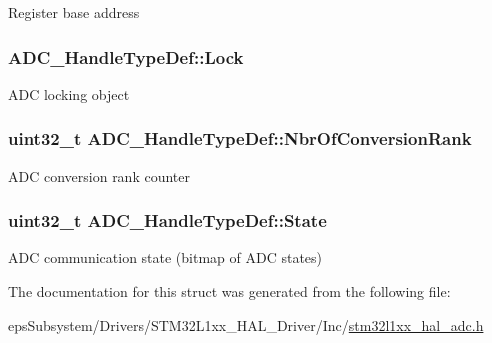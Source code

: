Register base address \hypertarget{struct_a_d_c___handle_type_def_a7ef248e63b28b67cd985bafaeffd68ba}{
\subsubsection[{Lock}]{ A\-D\-C\-\_\-\-Handle\-Type\-Def\-::\-Lock}}\label{struct_a_d_c___handle_type_def_a7ef248e63b28b67cd985bafaeffd68ba}
A\-D\-C locking object \hypertarget{struct_a_d_c___handle_type_def_a2abb5b84e713270bafebe5752bcb91c9}{
\subsubsection[{Nbr\-Of\-Conversion\-Rank}]{ uint32\-\_\-t A\-D\-C\-\_\-\-Handle\-Type\-Def\-::\-Nbr\-Of\-Conversion\-Rank}}\label{struct_a_d_c___handle_type_def_a2abb5b84e713270bafebe5752bcb91c9}
A\-D\-C conversion rank counter \hypertarget{struct_a_d_c___handle_type_def_abd63d2ae2064ef230986a43ae48f3df8}{
\subsubsection[{State}]{ uint32\-\_\-t A\-D\-C\-\_\-\-Handle\-Type\-Def\-::\-State}}\label{struct_a_d_c___handle_type_def_abd63d2ae2064ef230986a43ae48f3df8}
A\-D\-C communication state (bitmap of A\-D\-C states) 

The documentation for this struct was generated from the following file\-:\begin{DoxyCompactItemize}
\item 
eps\-Subsystem/\-Drivers/\-S\-T\-M32\-L1xx\-\_\-\-H\-A\-L\-\_\-\-Driver/\-Inc/\hyperlink{stm32l1xx__hal__adc_8h}{stm32l1xx\-\_\-hal\-\_\-adc.\-h}\end{DoxyCompactItemize}

